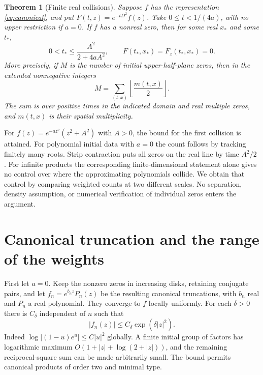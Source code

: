 \documentclass[11pt,a4paper]{article}
\newtheorem{theorem}{Theorem}[section]
\numberwithin{equation}{section}
\begin{document}
\begin{theorem}[Finite real collisions]\label{thm:collision}
Suppose $f$ has the representation \eqref{eq:canonical}, and put $F(t,z)=e^{-tD^2}f(z)$. Take
$0\le t<1/(4a)$, with no upper restriction if $a=0$.
If $f$ has a nonreal zero, then for some real $x_*$ and some $t_*$,
\[
 0<t_*\le \frac{A^2}{2+4aA^2},
 \qquad F(t_*,x_*)=F_z(t_*,x_*)=0 .
\]
More precisely, if $M$ is the number of initial upper-half-plane zeros,
then in the extended nonnegative integers
\begin{equation}\label{eq:exact-count}
 M=\sum_{(t,x)}\left\lfloor\frac{m(t,x)}{2}\right\rfloor .
\end{equation}
The sum is over positive times in the indicated domain and real
multiple zeros, and $m(t,x)$ is their spatial multiplicity.
\end{theorem}

For $f(z)=e^{-az^2}(z^2+A^2)$ with $A>0$, the bound for the first
collision is attained. For polynomial initial data with $a=0$ the
count follows by tracking finitely many roots. Strip contraction
puts all zeros on the real line by time $A^2/2$
\cite{deBruijn,Cardon}. For infinite products the corresponding
finite-dimensional statement alone gives no control over where the
approximating polynomials collide. We obtain that control by
comparing weighted counts at two different scales. No separation,
density assumption, or numerical verification of individual zeros
enters the argument.

\section{Canonical truncation and the range of the weights}
\label{sec:approx}
First let $a=0$. Keep the nonzero zeros in increasing disks,
retaining conjugate pairs, and let $f_n=e^{b_nz}P_n(z)$ be the
resulting canonical truncations, with $b_n$ real and $P_n$ a real
polynomial. They converge to $f$ locally uniformly. For each $\delta>0$
there is $C_\delta$ independent of $n$ such that
\[
                  |f_n(z)|\le C_\delta\exp(\delta |z|^2).
\]
Indeed $\log|(1-u)e^u|\le C|u|^2$ globally. A finite initial group of
factors has logarithmic maximum $O(1+|z|+\log(2+|z|))$,
and the remaining reciprocal-square sum can be made arbitrarily small.
The bound permits canonical products of order two and minimal type.
\end{document}
